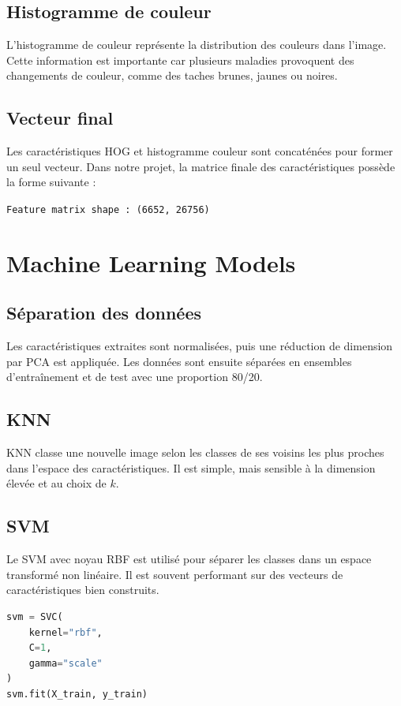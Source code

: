 \documentclass[12pt,a4paper]{report}
\begin{document}
\section{Histogramme de couleur}
L'histogramme de couleur représente la distribution des couleurs dans l'image. Cette information est importante car plusieurs maladies provoquent des changements de couleur, comme des taches brunes, jaunes ou noires.

\section{Vecteur final}
Les caractéristiques HOG et histogramme couleur sont concaténées pour former un seul vecteur. Dans notre projet, la matrice finale des caractéristiques possède la forme suivante :

\begin{center}
\texttt{Feature matrix shape : (6652, 26756)}
\end{center}

\chapter{Machine Learning Models}

\section{Séparation des données}
Les caractéristiques extraites sont normalisées, puis une réduction de dimension par PCA est appliquée. Les données sont ensuite séparées en ensembles d'entraînement et de test avec une proportion 80/20.

\section{KNN}
KNN classe une nouvelle image selon les classes de ses voisins les plus proches dans l'espace des caractéristiques. Il est simple, mais sensible à la dimension élevée et au choix de $k$.

\section{SVM}
Le SVM avec noyau RBF est utilisé pour séparer les classes dans un espace transformé non linéaire. Il est souvent performant sur des vecteurs de caractéristiques bien construits.

\begin{lstlisting}[language=Python, caption={Configuration du modèle SVM}]
svm = SVC(
    kernel="rbf",
    C=1,
    gamma="scale"
)
svm.fit(X_train, y_train)
\end{lstlisting}
\end{document}
